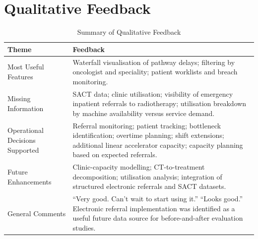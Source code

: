 \section{Qualitative Feedback} 
\begin{table}[h] 
    \centering 
    \begin{tabular}{|p{4cm}|p{10cm}|} 
        \hline 
        \textbf{Theme} & \textbf{Feedback} \\ 
        \hline\hline
        Most Useful Features & Waterfall visualisation of pathway delays; filtering by oncologist and speciality; patient worklists and breach monitoring. \\ 
        Missing Information & SACT data; clinic utilisation; visibility of emergency inpatient referrals to radiotherapy; utilisation breakdown by machine availability versus service demand. \\ 
        Operational Decisions Supported & Referral monitoring; patient tracking; bottleneck identification; overtime planning; shift extensions; additional linear accelerator capacity; capacity planning based on expected referrals. \\
        Future Enhancements & Clinic-capacity modelling; CT-to-treatment decomposition; utilisation analysis; integration of structured electronic referrals and SACT datasets. \\ 
        General Comments & ``Very good. Can't wait to start using it.'' \newline ``Looks good.'' \newline Electronic referral implementation was identified as a useful future data source for before-and-after evaluation studies. \\ 
        \hline 
    \end{tabular} 
    \caption{Summary of Qualitative Feedback} 
\end{table}